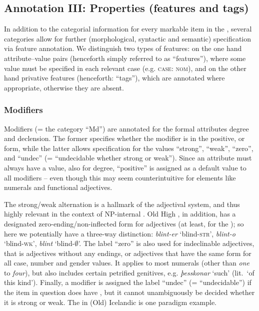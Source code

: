 \documentclass[output=paper,colorlinks,citecolor=brown]{langscibook}
\begin{document}
 
\subsection{Annotation III: Properties (features and tags)}
\label{sec:features}
\label{sec:anno3}

In addition to the categorial information for every markable item in the , several categories allow for further (morphological, syntactic and semantic) specification via feature annotation. We distinguish two types of features:  on the one hand attribute--value pairs (henceforth simply referred to as ``{features}''), where some value must be specified in each relevant case  (e.g. \textsc{case: nom}), and on the other hand privative features  (henceforth: ``{tags}''),  which are  annotated where appropriate, otherwise they are absent. 

\subsubsection{Modifiers}

Modifiers (= the category ``Md'') are  annotated for the formal attributes degree and declension. The former specifies whether the modifier is in the positive,  or  form, while the latter allows specification for the values ``strong'',  ``weak'', ``zero'', and ``undec'' (= ``undecidable whether strong or weak'').   
Since an attribute must always have a value, also for degree, ``positive'' is assigned as a default value to all modifiers -- even though this may seem counterintuitive for elements like numerals and functional adjectives. 


The strong/weak alternation is a hallmark of the  adjectival system, and thus highly relevant in the context of NP-internal . Old High , in addition, has a designated zero-ending/non-inflected form for adjectives (at least, for the ); so here we potentially have a three-way distinction:  \textit{blint-er} `blind-\textsc{str}', \textit{blint-o} `blind-\textsc{wk}', \textit{blint}  `blind-$\emptyset$'. 
The label ``zero'' is also used for indeclinable adjectives, that is adjectives without any endings, or adjectives that have the same form for all case, number and gender values. It applies to most numerals (other than \textit{one} to \textit{four}), but also includes certain petrified genitives, e.g.  \textit{þesskonar} `such' (lit.\ `of this kind').  
Finally,  a  modifier is assigned the label ``undec'' (= ``undecidable'')  if the item in question does have , but it cannot unambiguously be decided whether it is strong or weak. The   in (Old) Icelandic is one paradigm example. 
\end{document}
